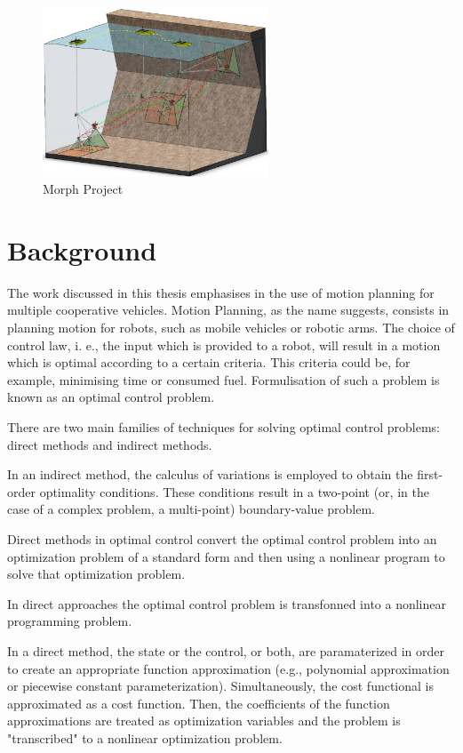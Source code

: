\begin{figure}[h!]
    \centering
    \includegraphics[width=0.6\textwidth]{Images/projects/Picture1.png}
    \caption{Morph Project}
    \label{fig:morph}
\end{figure}


\section{Background}

\par The work discussed in this thesis emphasises in the use of motion planning for multiple cooperative vehicles. Motion Planning, as the name suggests, consists in planning motion for robots, such as mobile vehicles or robotic arms. The choice of control law, i. e., the input which is provided to a robot, will result in a motion which is optimal according to a certain criteria. This criteria could be, for example, minimising time or consumed fuel. Formulisation of such a problem is known as an optimal control problem.
\par There are two main families of techniques for solving optimal control problems: direct methods and indirect methods.
\par In an indirect method, the calculus of variations is employed to obtain the first-order optimality conditions. These conditions result in a two-point (or, in the case of a complex problem, a multi-point) boundary-value problem.

\par Direct methods in optimal control convert the optimal control problem into an optimization problem of a standard form and then using a nonlinear program to solve that optimization problem. 
\par In direct approaches the optimal control problem is transfonned into a nonlinear
programming problem.
\par In a direct method, the state or the control, or both, are paramaterized in order to create an appropriate function approximation (e.g., polynomial approximation or piecewise constant parameterization). Simultaneously, the cost functional is approximated as a cost function. Then, the coefficients of the function approximations are treated as optimization variables and the problem is "transcribed" to a nonlinear optimization problem.

